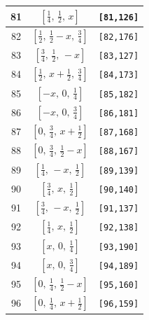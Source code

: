 \documentclass[fleqn,8pt]{jsarticle}
\begin{document}
\begin{longtable}{ccc}
81 & $\left[ \frac{1}{4},\, \frac{1}{2},\, x \right]$ & {\tt [81,126]} \\ \hline
82 & $\left[ \frac{1}{2},\, \frac{1}{2} - x,\, \frac{3}{4} \right]$ & {\tt [82,176]} \\ \hline
83 & $\left[ \frac{3}{4},\, \frac{1}{2},\, - x \right]$ & {\tt [83,127]} \\ \hline
84 & $\left[ \frac{1}{2},\, x + \frac{1}{2},\, \frac{3}{4} \right]$ & {\tt [84,173]} \\ \hline
85 & $\left[ - x,\, 0,\, \frac{1}{4} \right]$ & {\tt [85,182]} \\ \hline
86 & $\left[ - x,\, 0,\, \frac{3}{4} \right]$ & {\tt [86,181]} \\ \hline
87 & $\left[ 0,\, \frac{3}{4},\, x + \frac{1}{2} \right]$ & {\tt [87,168]} \\ \hline
88 & $\left[ 0,\, \frac{3}{4},\, \frac{1}{2} - x \right]$ & {\tt [88,167]} \\ \hline
89 & $\left[ \frac{1}{4},\, - x,\, \frac{1}{2} \right]$ & {\tt [89,139]} \\ \hline
90 & $\left[ \frac{3}{4},\, x,\, \frac{1}{2} \right]$ & {\tt [90,140]} \\ \hline
91 & $\left[ \frac{3}{4},\, - x,\, \frac{1}{2} \right]$ & {\tt [91,137]} \\ \hline
92 & $\left[ \frac{1}{4},\, x,\, \frac{1}{2} \right]$ & {\tt [92,138]} \\ \hline
93 & $\left[ x,\, 0,\, \frac{1}{4} \right]$ & {\tt [93,190]} \\ \hline
94 & $\left[ x,\, 0,\, \frac{3}{4} \right]$ & {\tt [94,189]} \\ \hline
95 & $\left[ 0,\, \frac{1}{4},\, \frac{1}{2} - x \right]$ & {\tt [95,160]} \\ \hline
96 & $\left[ 0,\, \frac{1}{4},\, x + \frac{1}{2} \right]$ & {\tt [96,159]} \\
\end{longtable}
\renewcommand{\arraystretch}{1.2}
\end{document}
